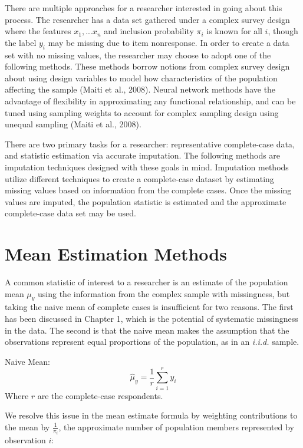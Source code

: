 \documentclass[12pt,twoside]{reedthesis}
\begin{document}
There are multiple approaches for a researcher interested in going about
this process. The researcher has a data set gathered under a complex
survey design where the features \(x_1,...x_n\) and inclusion
probability \(\pi_i\) is known for all \(i\), though the label \(y_i\)
may be missing due to item nonresponse. In order to create a data set
with no missing values, the researcher may choose to adopt one of the
following methods. These methods borrow notions from complex survey
design about using design variables to model how characteristics of the
population affecting the sample (Maiti et al., 2008). Neural network
methods have the advantage of flexibility in approximating any
functional relationship, and can be tuned using sampling weights to
account for complex sampling design using unequal sampling (Maiti et
al., 2008).

There are two primary tasks for a researcher: representative
complete-case data, and statistic estimation via accurate imputation.
The following methods are imputation techniques designed with these
goals in mind. Imputation methods utilize different techniques to create
a complete-case dataset by estimating missing values based on
information from the complete cases. Once the missing values are
imputed, the population statistic is estimated and the approximate
complete-case data set may be used.

\section{Mean Estimation Methods}\label{mean-estimation-methods}

A common statistic of interest to a researcher is an estimate of the
population mean \(\mu_y\) using the information from the complex sample
with missingness, but taking the naive mean of complete cases is
insufficient for two reasons. The first has been discussed in Chapter 1,
which is the potential of systematic missingness in the data. The second
is that the naive mean makes the assumption that the observations
represent equal proportions of the population, as in an \emph{i.i.d.}
sample.

Naive Mean: \[
\hat \mu_y = \frac{1}{r} \sum_{i=1}^r y_i
\] Where \(r\) are the complete-case respondents.

We resolve this issue in the mean estimate formula by weighting
contributions to the mean by \(\frac{1}{\pi_i}\), the approximate number
of population members represented by observation \(i\):
\end{document}
